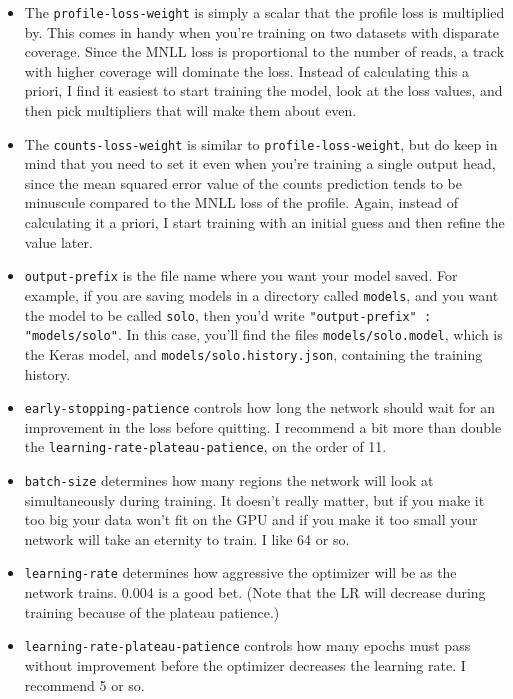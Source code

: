 \documentclass{article}
\begin{document}
\begin{itemize}
    \item The \texttt{profile-loss-weight} is simply a scalar that the profile loss is multiplied
        by. This comes in handy when you're training on two datasets with disparate coverage.
        Since the MNLL loss is proportional to the number of reads, a track with higher
        coverage will dominate the loss. Instead of calculating this a priori, I find it
        easiest to start training the model, look at the loss values, and then pick
        multipliers that will make them about even.
    \item The \texttt{counts-loss-weight} is similar to \texttt{profile-loss-weight}, but do keep
        in mind that you need to set it even when you're training a single output head, since
        the mean squared error value of the counts prediction tends to be minuscule compared
        to the MNLL loss of the profile. Again, instead of calculating it a priori, I start
        training with an initial guess and then refine the value later.
    \item \texttt{output-prefix} is the file name where you want your model saved.
        For example, if you are saving models in a directory called \texttt{models}, and you
        want the model to be called \texttt{solo}, then you'd write
        \texttt{"output-prefix" : "models/solo"}. In this case, you'll find the files
        \texttt{models/solo.model}, which is the Keras model, and
        \texttt{models/solo.history.json}, containing the training history.
    \item \texttt{early-stopping-patience} controls how long the network should wait for an
        improvement in the loss before quitting. I recommend a bit more than double the
        \texttt{learning-rate-plateau-patience}, on the order of 11.
    \item \texttt{batch-size} determines how many regions the network will look at simultaneously
        during training. It doesn't really matter, but if you make it too big your data won't
        fit on the GPU and if you make it too small your network will take an eternity to
        train. I like 64 or so.
    \item \texttt{learning-rate} determines how aggressive the optimizer will be as the network
        trains. 0.004 is a good bet. (Note that the LR will decrease during training
        because of the plateau patience.)
    \item \texttt{learning-rate-plateau-patience} controls how many epochs must pass without
        improvement before the optimizer decreases the learning rate. I recommend 5 or so.


\end{itemize}
\end{document}
